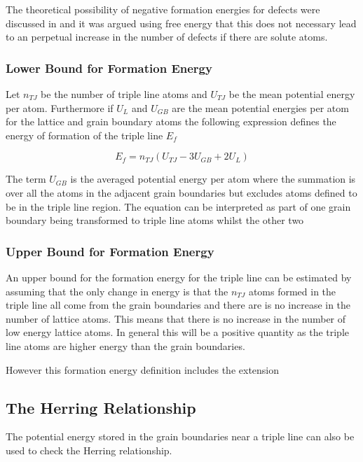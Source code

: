 \documentclass[12pt,a4paper]{book}
\begin{document}
The theoretical possibility of negative formation energies for defects were discussed in \cite{KIRCHHEIM20075129} and it was argued using free energy that this does not necessary lead to an perpetual increase in the number of defects if there are solute atoms.  

\subsubsection{Lower Bound for Formation Energy}

Let $n_{TJ}$ be the number of triple line atoms and $U_{TJ}$ be the mean potential energy per atom. Furthermore if $U_{L}$ and $U_{GB}$ are the mean potential energies per atom for the lattice and grain boundary atoms the following expression defines the energy of formation of the triple line $E_{f}$

\[ E_{f} = n_{TJ}\left(U_{TJ} -3U_{GB} + 2U_{L} \right) \]

The term $U_{GB}$ is the averaged potential energy per atom where the summation is over all the atoms in the adjacent grain boundaries but excludes atoms defined to be in the triple line region. The equation can be interpreted as part of one grain boundary being transformed to triple line atoms whilst the other two     

\subsubsection{Upper Bound for Formation Energy}

An upper bound for the formation energy for the triple line can be estimated by assuming that the only change in energy is that the  $n_{TJ}$ atoms formed in the triple line all come from the grain boundaries and there are is no increase in the number of lattice atoms. This means that there is no increase in the number of low energy lattice atoms. In general this will be a positive quantity as the triple line atoms are higher energy than the grain boundaries. 

However this formation energy definition includes the extension  


\subsection{The Herring Relationship}

The potential energy stored in the grain boundaries near a triple line can also be used to check the Herring relationship.
\end{document}
